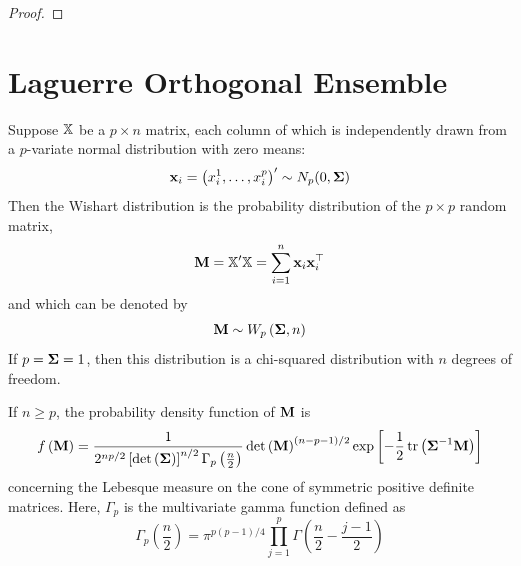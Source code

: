 \begin{proof}

\end{proof}

\section{Laguerre Orthogonal Ensemble}

\begin{definition}
	Suppose \(\mathbb{X}\) be a \(p\times n\) matrix, each column of which is independently drawn from a \(p\)-variate normal distribution with zero means:
	\begin{equation*}
		\mathbf{x}_{i}=\left(x_{i}^{1},\ldots,x_{i}^{p}\right)^{\prime}\sim N_{p}(0,\boldsymbol{\Sigma})
	\end{equation*}
	Then the Wishart distribution is the probability distribution of the \(p\times p\) random matrix,
	\begin{equation}
		\mathbf{M}=\mathbb{X}^{\prime}\mathbb{X}=\sum_{i=1}^{n}\mathbf{x}_{i}\mathbf{x}_{i}^{\top}
	\end{equation}
	and which can be denoted by
	\begin{equation*}
		\mathbf{M}\sim W_{p}\left(\boldsymbol{\Sigma},n\right)
	\end{equation*}
	If \(p=\boldsymbol{\Sigma}=1\), then this distribution is a chi-squared distribution with \(n\) degrees of freedom.
\end{definition}

\begin{theorem}
	If \(n\geq p\), the probability density function of \(\mathbf{M}\) is
	\begin{equation}
		f\left(\mathbf{M}\right)=\frac{1}{2^{np/2}\left[\det\left(\boldsymbol{\Sigma}\right)\right]^{n/2}\Gamma_{p}\left(\frac{n}{2}\right)}\det\left(\mathbf{M}\right)^{(n-p-1)/2}\exp\left[-\frac{1}{2}\operatorname{tr}\left(\boldsymbol{\Sigma}^{-1}\mathbf{M}\right)\right]
		\label{eq:pdf-wishart}
	\end{equation}
	concerning the Lebesque measure on the cone of symmetric positive definite matrices. Here, \(\Gamma_{p}\) is the multivariate gamma function defined as
	\begin{equation*}
		\Gamma_{p}\left(\frac{n}{2}\right)=\pi^{p(p-1)/4}\prod_{j=1}^{p}\Gamma\left(\frac{n}{2}-\frac{j-1}{2}\right)
	\end{equation*}
\end{theorem}

